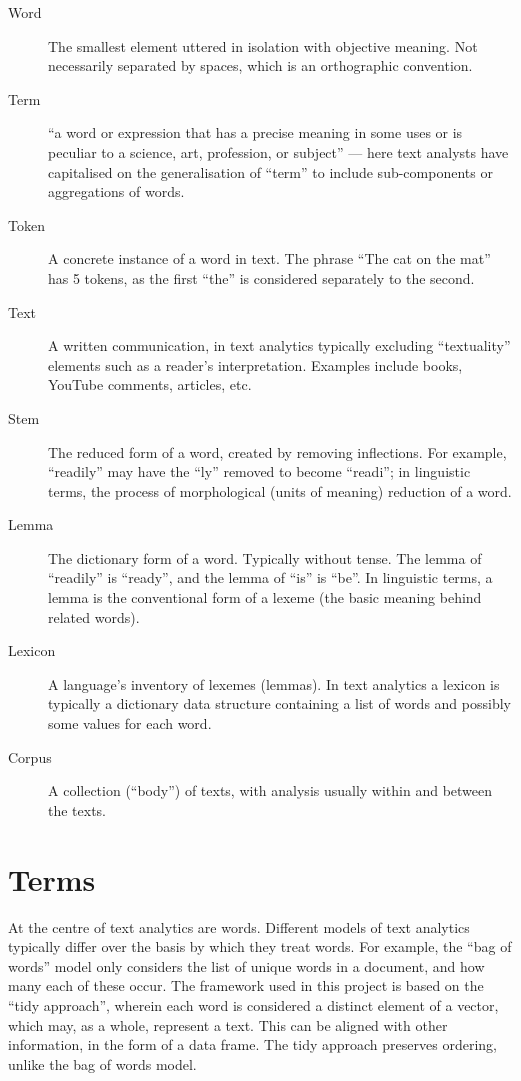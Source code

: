 \documentclass[11pt, a4paper, titlepage]{report}
\begin{document}
\begin{description}
\item[\gls{Word}] The smallest element uttered in isolation with
  objective meaning. Not necessarily separated by spaces, which is an
  orthographic convention.
\item[\gls{Term}] ``a word or expression that has a precise meaning in
  some uses or is peculiar to a science, art, profession, or subject''
  \autocite{dictionary:_term_defin_term} --- here text analysts have
  capitalised on the generalisation of ``term'' to include
  sub-components or aggregations of words.
\item[\gls{Token}] A concrete instance of a word in text. The phrase
  ``The cat on the mat'' has 5 tokens, as the first ``the'' is
  considered separately to the second.
\item[\gls{Text}] A written communication, in text analytics typically
  excluding ``textuality'' elements such as a reader's interpretation.
  Examples include books, YouTube comments, articles, etc.
\item[\gls{Stem}] The reduced form of a word, created by removing
  inflections. For example, ``readily'' may have the ``ly'' removed to
  become ``readi''; in linguistic terms, the process of morphological
  (units of meaning) reduction of a word.
\item[\gls{Lemma}] The dictionary form of a word. Typically without
  tense. The lemma of ``readily'' is ``ready'', and the lemma of
  ``is'' is ``be''. In linguistic terms, a lemma is the conventional
  form of a lexeme (the basic meaning behind related words).
\item[\gls{Lexicon}] A language's inventory of lexemes (lemmas). In
  text analytics a lexicon is typically a dictionary data structure
  containing a list of words and possibly some values for each word.
\item[\gls{Corpus}] A collection (``body'') of texts, with analysis
  usually within and between the texts.
\end{description}

\section{Terms}

At the centre of text analytics are words. Different models of text
analytics typically differ over the basis by which they treat words.
For example, the ``bag of words'' model only considers the list of
unique words in a document, and how many each of these occur. The
framework used in this project is based on the ``tidy approach'',
wherein each word is considered a distinct element of a vector, which
may, as a whole, represent a text. This can be aligned with other
information, in the form of a data frame. The tidy approach preserves
ordering, unlike the bag of words model.
\end{document}
